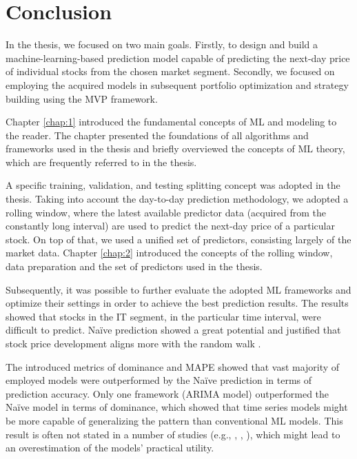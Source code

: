 \chapter*{Conclusion} 

In the thesis, we focused on two main goals. Firstly, to design and build a machine-learning-based prediction model capable of predicting the next-day price
of individual stocks from the chosen market segment. Secondly, we focused on employing the acquired models in subsequent portfolio optimization 
and strategy building using the MVP framework.

Chapter \ref{chap:1} introduced the fundamental concepts of ML and modeling to the reader. The chapter presented the foundations of all algorithms and frameworks used in the thesis
and briefly overviewed the concepts of ML theory, which are frequently referred to in the thesis.

A specific training, validation, and testing splitting concept was adopted in the thesis. Taking into account the day-to-day prediction methodology, we adopted a rolling window, where 
the latest available predictor data (acquired from the constantly long interval) are used to predict the next-day price of a particular stock. On top of that, we used a unified set of predictors, consisting 
largely of the market data. Chapter \ref{chap:2} introduced the concepts of the rolling window, data preparation and the set of predictors used in the thesis.

Subsequently, it was possible to further evaluate the adopted ML frameworks and optimize their settings in order to achieve the best prediction results. The results showed that stocks in the IT segment,
in the particular time interval, were difficult to predict. Naïve prediction showed a great potential and justified that stock price development aligns more with the random walk \cite{fama1970efficient}. 

The introduced metrics of dominance and MAPE showed that vast majority of employed models were outperformed by the Naïve prediction in terms of prediction accuracy.
Only one framework (ARIMA model) outperformed the Naïve model in terms of dominance, which showed that time series models might be more capable of generalizing the pattern than conventional ML models.
This result is often not stated in a number of studies (e.g., \cite{patel}, \cite{vijh}, \cite{konferencia1}), which might lead to an overestimation of the models' practical utility.

